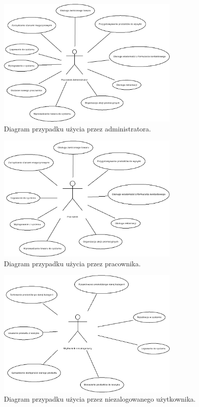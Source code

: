 \documentclass[a4paper,11pt]{article}
\begin{document}
\begin{figure}[H]
	\centering
		\includegraphics[width=0.8\textwidth]{Diagramy/PrzypadkiUzycia/Admin.jpeg}
	\caption{Diagram przypadku użycia przez administratora.}
\end{figure}
\begin{figure}[H]
	\centering
		\includegraphics[width=0.8\textwidth]{Diagramy/PrzypadkiUzycia/Pracownik.jpeg}
	\caption{Diagram przypadku użycia przez pracownika.}
\end{figure}
\begin{figure}[H]
	\centering
		\includegraphics[width=0.8\textwidth]{Diagramy/PrzypadkiUzycia/Niezalogowany.jpeg}
	\caption{Diagram przypadku użycia przez niezalogowanego użytkownika.}
\end{figure}
\end{document}
